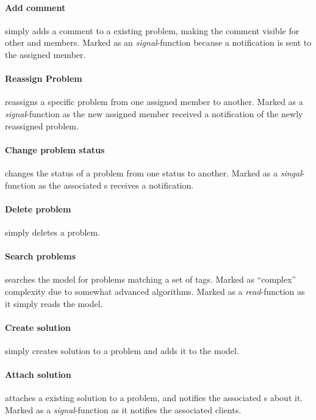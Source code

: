 \paragraph{Add comment} simply adds a comment to a existing problem, making the comment visible for other \client{} and \astaff[] members. Marked as an \textit{signal}-function because a notification is sent to the assigned \astaff[] member.  

\paragraph{Reassign Problem} reassigns a specific problem from one assigned \astaff[] member to another. Marked as a \textit{signal}-function as the new assigned \astaff[] member received a notification of the newly reassigned problem. 

\paragraph{Change problem status} changes the status of a problem from one status to another. Marked as a \textit{singal}-function as the associated \client s receives a notification. 

\paragraph{Delete problem} simply deletes a problem. 

\paragraph{Search problems} searches the model for problems matching a set of tags. Marked as ``complex'' complexity due to somewhat advanced algorithms. Marked as a \textit{read}-function as it simply reads the model.

\paragraph{Create solution} simply creates solution to a problem and adds it to the model. 

\paragraph{Attach solution} attaches a existing solution to a problem, and notifies the associated \client s about it. Marked as a \textit{signal}-function as it notifies the associated clients. 

